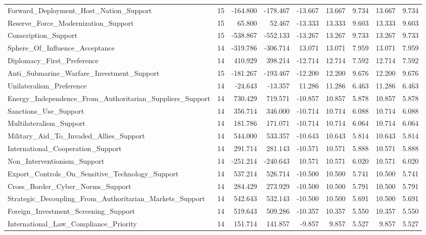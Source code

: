 \begin{table}[htbp]
\begin{threeparttable}
\begin{adjustbox}{max width=\linewidth}
\begin{tabular}{lrrrrrrrr}
Forward\_Deployment\_Host\_Nation\_Support & 15 & -164.800 & -178.467 & -13.667 & 13.667 & 9.734 & 13.667 & 9.734 \\
Reserve\_Force\_Modernization\_Support & 15 & 65.800 & 52.467 & -13.333 & 13.333 & 9.603 & 13.333 & 9.603 \\
Conscription\_Support & 15 & -538.867 & -552.133 & -13.267 & 13.267 & 9.733 & 13.267 & 9.733 \\
Sphere\_Of\_Influence\_Acceptance & 14 & -319.786 & -306.714 & 13.071 & 13.071 & 7.959 & 13.071 & 7.959 \\
Diplomacy\_First\_Preference & 14 & 410.929 & 398.214 & -12.714 & 12.714 & 7.592 & 12.714 & 7.592 \\
Anti\_Submarine\_Warfare\_Investment\_Support & 15 & -181.267 & -193.467 & -12.200 & 12.200 & 9.676 & 12.200 & 9.676 \\
Unilateralism\_Preference & 14 & -24.643 & -13.357 & 11.286 & 11.286 & 6.463 & 11.286 & 6.463 \\
Energy\_Independence\_From\_Authoritarian\_Suppliers\_Support & 14 & 730.429 & 719.571 & -10.857 & 10.857 & 5.878 & 10.857 & 5.878 \\
Sanctions\_Use\_Support & 14 & 356.714 & 346.000 & -10.714 & 10.714 & 6.088 & 10.714 & 6.088 \\
Multilateralism\_Support & 14 & 181.786 & 171.071 & -10.714 & 10.714 & 6.064 & 10.714 & 6.064 \\
Military\_Aid\_To\_Invaded\_Allies\_Support & 14 & 544.000 & 533.357 & -10.643 & 10.643 & 5.814 & 10.643 & 5.814 \\
International\_Cooperation\_Support & 14 & 291.714 & 281.143 & -10.571 & 10.571 & 5.888 & 10.571 & 5.888 \\
Non\_Interventionism\_Support & 14 & -251.214 & -240.643 & 10.571 & 10.571 & 6.020 & 10.571 & 6.020 \\
Export\_Controls\_On\_Sensitive\_Technology\_Support & 14 & 537.214 & 526.714 & -10.500 & 10.500 & 5.741 & 10.500 & 5.741 \\
Cross\_Border\_Cyber\_Norms\_Support & 14 & 284.429 & 273.929 & -10.500 & 10.500 & 5.791 & 10.500 & 5.791 \\
Strategic\_Decoupling\_From\_Authoritarian\_Markets\_Support & 14 & 542.643 & 532.143 & -10.500 & 10.500 & 5.691 & 10.500 & 5.691 \\
Foreign\_Investment\_Screening\_Support & 14 & 519.643 & 509.286 & -10.357 & 10.357 & 5.550 & 10.357 & 5.550 \\
International\_Law\_Compliance\_Priority & 14 & 151.714 & 141.857 & -9.857 & 9.857 & 5.527 & 9.857 & 5.527 \\

\end{tabular}
\end{adjustbox}
\end{threeparttable}
\end{table}
